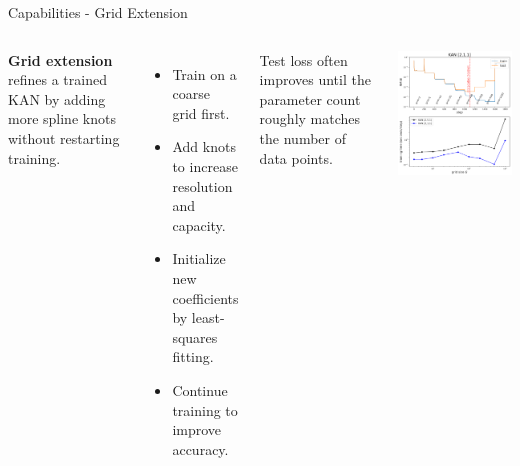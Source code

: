 \documentclass[aspectratio=169]{beamer}
\begin{document}
\begin{frame}{Capabilities - Grid Extension}
	\begin{columns}[T,onlytextwidth]
		
		\textbf{Grid extension} refines a trained KAN by adding more spline knots without restarting training.
		
		\begin{itemize}
			\item Train on a coarse grid first.
			\item Add knots to increase resolution and capacity.
			\item Initialize new coefficients by least-squares fitting.
			\item Continue training to improve accuracy.
		\end{itemize}
		
		Test loss often improves until the parameter count roughly matches the number of data points.
		
		\centering
		\includegraphics[height=0.8\textheight]{../images/grid_extension.png}
		
	\end{columns}
\end{frame}
\end{document}

